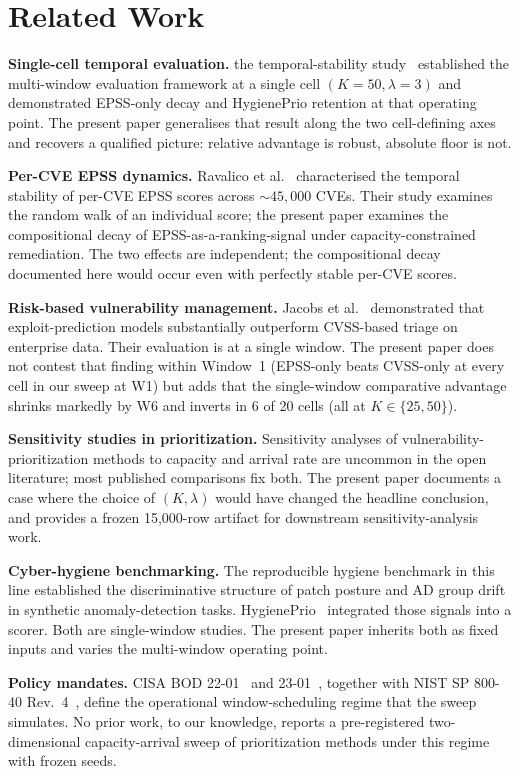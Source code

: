 \section{Related Work}

\textbf{Single-cell temporal evaluation.} the temporal-stability study~\cite{paper5temporal}
established the multi-window evaluation framework at a single cell
$(K = 50, \lambda = 3)$ and demonstrated EPSS-only decay and
HygienePrio retention at that operating point. The present paper
generalises that result along the two cell-defining axes and recovers
a qualified picture: relative advantage is robust, absolute floor is not.

\textbf{Per-CVE EPSS dynamics.} Ravalico et al.~\cite{ravalico2025epsstemporal}
characterised the temporal stability of per-CVE EPSS scores across
$\sim 45{,}000$ CVEs. Their study examines the random walk of an
individual score; the present paper examines the compositional decay
of EPSS-as-a-ranking-signal under capacity-constrained remediation.
The two effects are independent; the compositional decay documented
here would occur even with perfectly stable per-CVE scores.

\textbf{Risk-based vulnerability management.}
Jacobs et al.~\cite{jacobs2020improving} demonstrated that
exploit-prediction models substantially outperform CVSS-based triage
on enterprise data. Their evaluation is at a single window. The
present paper does not contest that finding within Window~1 (EPSS-only
beats CVSS-only at every cell in our sweep at W1) but adds that the
single-window comparative advantage shrinks markedly by W6 and
inverts in 6 of 20 cells (all at $K \in \{25, 50\}$).

\textbf{Sensitivity studies in prioritization.} Sensitivity analyses
of vulnerability-prioritization methods to capacity and arrival rate
are uncommon in the open literature; most published comparisons fix
both. The present paper documents a case where the choice of
$(K, \lambda)$ would have changed the headline conclusion, and
provides a frozen 15{,}000-row artifact for downstream
sensitivity-analysis work.

\textbf{Cyber-hygiene benchmarking.}
The reproducible hygiene benchmark in this line established the
discriminative structure of patch posture and AD group drift in
synthetic anomaly-detection tasks.
HygienePrio~\cite{paper4hygieneprio} integrated those
signals into a scorer. Both are single-window studies. The present
paper inherits both as fixed inputs and varies the multi-window
operating point.

\textbf{Policy mandates.} CISA BOD 22-01~\cite{cisa2021bod2201} and
23-01~\cite{cisa2022bod2301}, together with NIST SP 800-40
Rev.~4~\cite{nist2022sp80040r4}, define the operational
window-scheduling regime that the sweep simulates. No prior work, to
our knowledge, reports a pre-registered two-dimensional capacity-arrival
sweep of prioritization methods under this regime with frozen seeds.
